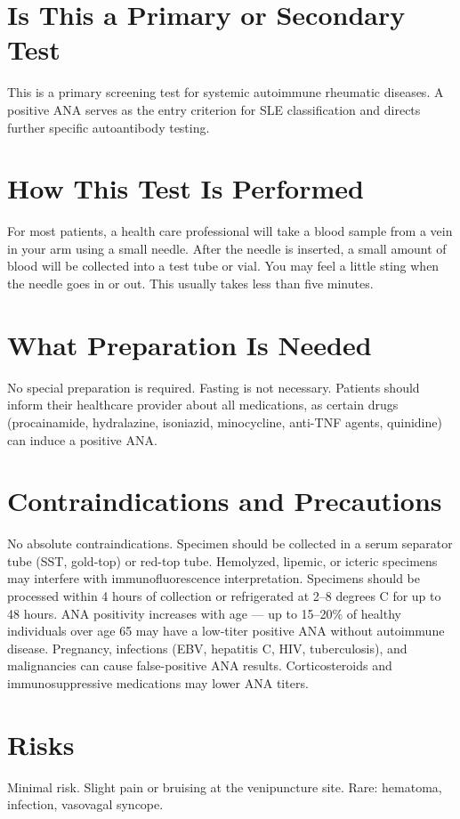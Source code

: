 \section*{Is This a Primary or Secondary Test}
This is a primary screening test for systemic autoimmune rheumatic diseases. A positive ANA serves as the entry criterion for SLE classification and directs further specific autoantibody testing.

\section*{How This Test Is Performed}
For most patients, a health care professional will take a blood sample from a vein in your arm using a small needle. After the needle is inserted, a small amount of blood will be collected into a test tube or vial. You may feel a little sting when the needle goes in or out. This usually takes less than five minutes.

\section*{What Preparation Is Needed}
No special preparation is required. Fasting is not necessary. Patients should inform their healthcare provider about all medications, as certain drugs (procainamide, hydralazine, isoniazid, minocycline, anti-TNF agents, quinidine) can induce a positive ANA.

\section*{Contraindications and Precautions}
No absolute contraindications. Specimen should be collected in a serum separator tube (SST, gold-top) or red-top tube. Hemolyzed, lipemic, or icteric specimens may interfere with immunofluorescence interpretation. Specimens should be processed within 4 hours of collection or refrigerated at 2--8 degrees C for up to 48 hours. ANA positivity increases with age --- up to 15--20\% of healthy individuals over age 65 may have a low-titer positive ANA without autoimmune disease. Pregnancy, infections (EBV, hepatitis C, HIV, tuberculosis), and malignancies can cause false-positive ANA results. Corticosteroids and immunosuppressive medications may lower ANA titers.

\section*{Risks}
Minimal risk. Slight pain or bruising at the venipuncture site. Rare: hematoma, infection, vasovagal syncope.

